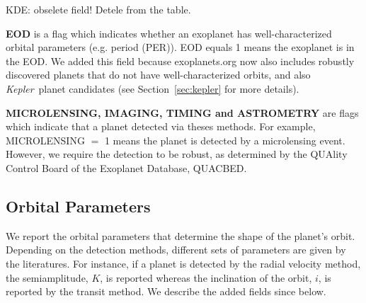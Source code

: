 \documentclass[11pt,preprint]{aastex}
\def\kepler{\textit{Kepler}}
\begin{document}
\begin{CJK*}{UTF8}{gbsn}
\begin{comment}
\textit {Sharon: you need to say what KOI stores. When writing each
  field, keep in mind you need to cover the following so that the
  reader will completely understand: (1) what the field stands for
  (e.g., in case of an abbreviation like KOI); (2) what the field
  physically means, like `KOI' means planet candidates that have
  transit signals as detected by \kepler\ but have not been confirmed,
  and make sure to be thorough at what you say -- sometimes things are
  not that obvious to an outsider reader, e.g., think if a cosmologist
  would understand what you're saying when reading it; (3) what the
  field actually contains, e.g. KOI contains the KOI number designated
  by the \kepler\ team (right?), it is a floating point number, and
  sometimes maybe even worth giving an example, e.g. KOI 30.1 or
  something...; (4) why we added this new field, if this information
  is helpful, or if it's a revised field since \cite{Wright2011}, what
  is changed. Also, use \kepler\ (which is a defined symbol in our
  ms.tex file), instead of typing out Kepler, since you need italic.
  Don't be afraid to write more! Being concise is important, but it's
  always easier to trim down things than to add things on, especially
  for a documentation type of paper like this. Let's be thorough at
  first, then try to reach optimal conciseness.}
 \end{comment}

KDE: obselete field! Detele from the table.

{\bf EOD} is a flag which indicates whether an exoplanet has
well-characterized orbital parameters (e.g. period (PER)). EOD equals
1 means the exoplanet is in the EOD. We added this field because
exoplanets.org now also includes robustly discovered planets that do
not have well-characterized orbits, and also \kepler\ planet
candidates (see Section~\ref{sec:kepler} for more details).

{\bf MICROLENSING, IMAGING, TIMING and ASTROMETRY} are flags which
indicate that a planet detected via theses methods. For example,
MICROLENSING $=$ 1 means the planet is detected by a microlensing
event. However, we require the detection to be robust, as determined
by the QUAlity Control Board of the Exoplanet Database, QUACBED.


\subsection{Orbital Parameters}
We report the orbital parameters that determine the shape of the
planet's orbit. Depending on the detection methods, different sets of
parameters are given by the literatures. For instance, if a planet is
detected by the radial velocity method, the semiamplitude, $K$, is
reported whereas the inclination of the orbit, $i$, is reported by the
transit method. We describe the added fields since \cite{Wright2011}
below.  


\end{CJK*}
\end{document}
